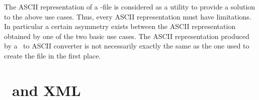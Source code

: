 The ASCII representation of a \nexus-file is considered as a utility to provide
a solution to the above use cases. Thus, every ASCII representation must have 
limitations. In particular a certain asymmetry exists between the ASCII 
representation obtained by one of the two basic use cases. 
The ASCII representation produced by a \nexus\ to ASCII converter is not
necessarily  exactly the same as the one used to create the file in the first
place.
\begin{figure}[tb]
\centering
{}
\end{figure}

\section{\nexus\ and XML}

